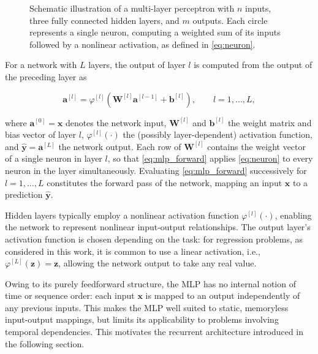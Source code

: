 \begin{figure}[htb]
	\caption{Schematic illustration of a multi-layer perceptron with $n$ inputs, three fully connected hidden layers, and $m$ outputs. Each circle represents a single neuron, computing a weighted sum of its inputs followed by a nonlinear activation, as defined in \eqref{eq:neuron}.}
	\label{fig:mlp_architecture}
\end{figure}

For a network with $L$ layers, the output of layer $l$ is computed from the output of the preceding layer as

\begin{equation}
	\bm{a}^{[l]} = \varphi^{[l]}\left(\bm{W}^{[l]} \bm{a}^{[l-1]} + \bm{b}^{[l]}\right), \qquad l = 1, \dots, L,
	\label{eq:mlp_forward}
\end{equation}

where $\bm{a}^{[0]} = \bm{x}$ denotes the network input, $\bm{W}^{[l]}$ and $\bm{b}^{[l]}$ the weight matrix and bias vector of layer $l$, $\varphi^{[l]}(\cdot)$ the (possibly layer-dependent) activation function, and $\hat{\bm{y}} = \bm{a}^{[L]}$ the network output. Each row of $\bm{W}^{[l]}$ contains the weight vector of a single neuron in layer $l$, so that \eqref{eq:mlp_forward} applies \eqref{eq:neuron} to every neuron in the layer simultaneously. Evaluating \eqref{eq:mlp_forward} successively for $l = 1, \dots, L$ constitutes the forward pass of the network, mapping an input $\bm{x}$ to a prediction $\hat{\bm{y}}$.

Hidden layers typically employ a nonlinear activation function $\varphi^{[l]}(\cdot)$, enabling the network to represent nonlinear input-output relationships. The output layer's activation function is chosen depending on the task: for regression problems, as considered in this work, it is common to use a linear activation, i.e., $\varphi^{[L]}(\bm{z}) = \bm{z}$, allowing the network output to take any real value.

Owing to its purely feedforward structure, the MLP has no internal notion of time or sequence order: each input $\bm{x}$ is mapped to an output independently of any previous inputs. This makes the MLP well suited to static, memoryless input-output mappings, but limits its applicability to problems involving temporal dependencies. This motivates the recurrent architecture introduced in the following section.






